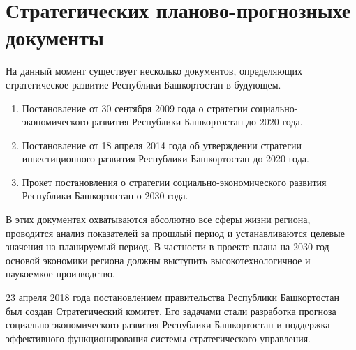 \section{Стратегических планово-прогнозныхе документы}

На данный момент существует несколько документов, определяющих стратегическое развитие Республики Башкортостан в будующем.
\begin{enumerate}
	\item Постановление от 30 сентября 2009 года о стратегии социально-экономического развития Республики Башкортостан до 2020 года.
	\item Постановление от 18 апреля 2014 года об утверждении стратегии инвестиционного развития Республики Башкортостан до 2020 года.
	\item Прокет постановления о стратегии социально-экономического развития Республики Башкортостан о 2030 года.
\end{enumerate}

В этих документах охватываются абсолютно все сферы жизни региона, проводится анализ показателей за прошлый период и устанавливаются целевые значения на планируемый период. В частности в проекте плана на 2030 год основой экономики региона должны выступить высокотехнологичное и наукоемкое производство.

23 апреля 2018 года постановлением правительства Республики Башкортостан был создан Стратегический комитет. Его задачами стали разработка прогноза социально-экономического развития Республики Башкортостан и поддержка эффективного функционирования системы стратегического управления.